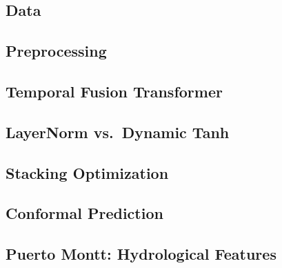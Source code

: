 \documentclass[applsci,article,submit,moreauthors,pdftex]{Definitions/mdpi}
\begin{document}
\subsection{Data}

\subsection{Preprocessing}

\subsection{Temporal Fusion Transformer}

\subsection{LayerNorm vs.\ Dynamic Tanh}

\subsection{Stacking Optimization}

\subsection{Conformal Prediction}

\subsection{Puerto Montt: Hydrological Features}
\end{document}
